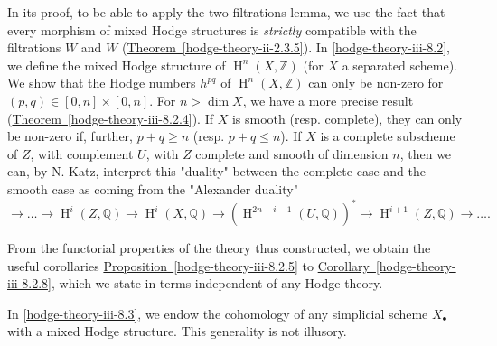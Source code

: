   In its proof, to be able to apply the two-filtrations lemma, we use the fact that every morphism of mixed Hodge structures is \emph{strictly} compatible with the filtrations \(W\) and \(W\) (\hyperref[hodge-theory-ii-2.3.5]{Theorem~\ref*{hodge-theory-ii-2.3.5}}).
  In \cref{hodge-theory-iii-8.2}, we define the mixed Hodge structure of \(\operatorname {H}^n(X,\mathbb {Z})\) (for \(X\) a separated scheme).
  We show that the Hodge numbers \(h^{pq}\) of \(\operatorname {H}^n(X,\mathbb {Z})\) can only be non-zero for \((p,q)\in [0,n]\times [0,n]\).
  For \(n>\dim  X\), we have a more precise result (\hyperref[hodge-theory-iii-8.2.4]{Theorem~\ref*{hodge-theory-iii-8.2.4}}).
  If \(X\) is smooth (resp. complete), they can only be non-zero if, further, \(p+q\geqslant  n\) (resp. \(p+q\leqslant  n\)).
  If \(X\) is a complete subscheme of \(Z\), with complement \(U\), with \(Z\) complete and smooth of dimension \(n\), then we can, by N. Katz, interpret this "duality" between the complete case and the smooth case as coming from the "Alexander duality"
  \[     \to  \ldots      \to  \operatorname {H}^i(Z,\mathbb {Q})     \to  \operatorname {H}^i(X,\mathbb {Q})     \to  (\operatorname {H}^{2n-i-1}(U,\mathbb {Q}))^*     \to  \operatorname {H}^{i+1}(Z,\mathbb {Q})     \to \ldots .   \]\par{}From the functorial properties of the theory thus constructed, we obtain the useful corollaries \hyperref[hodge-theory-iii-8.2.5]{Proposition~\ref*{hodge-theory-iii-8.2.5}} to \hyperref[hodge-theory-iii-8.2.8]{Corollary~\ref*{hodge-theory-iii-8.2.8}}, which we state in terms independent of any Hodge theory.\par{}In \cref{hodge-theory-iii-8.3}, we endow the cohomology of any simplicial scheme \(X_\bullet \) with a mixed Hodge structure.
  This generality is not illusory.

